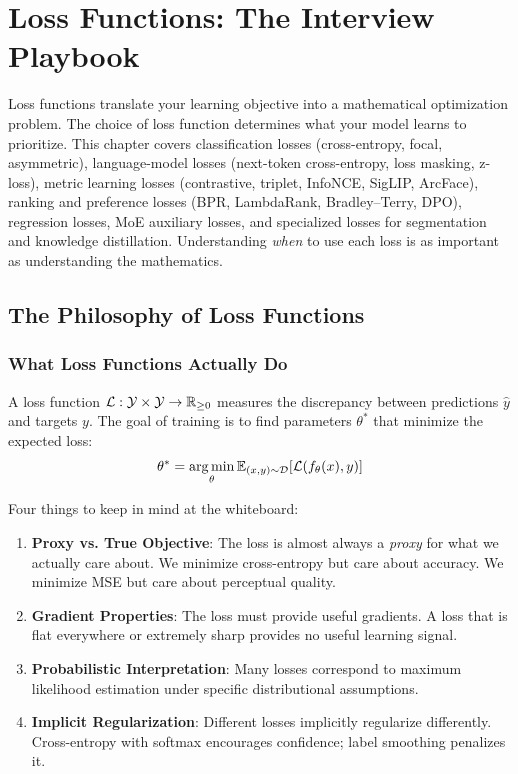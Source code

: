 \chapter{Loss Functions: The Interview Playbook}
\label{chap:loss_functions}

\begin{tldr}
Loss functions translate your learning objective into a mathematical optimization problem. The choice of loss function determines what your model learns to prioritize. This chapter covers classification losses (cross-entropy, focal, asymmetric), language-model losses (next-token cross-entropy, loss masking, z-loss), metric learning losses (contrastive, triplet, InfoNCE, SigLIP, ArcFace), ranking and preference losses (BPR, LambdaRank, Bradley--Terry, DPO), regression losses, MoE auxiliary losses, and specialized losses for segmentation and knowledge distillation. Understanding \textit{when} to use each loss is as important as understanding the mathematics.
\end{tldr}

\section{The Philosophy of Loss Functions}
\label{sec:loss_philosophy}

\subsection{What Loss Functions Actually Do}

A loss function $\mathcal{L}: \mathcal{Y} \times \mathcal{Y} \to \mathbb{R}_{\geq 0}$ measures the discrepancy between predictions $\hat{y}$ and targets $y$. The goal of training is to find parameters $\theta^*$ that minimize the expected loss:
\begin{equation}
\theta^* = \operatorname*{arg\,min}_\theta \operatorname{\mathbb{E}}_{(x,y) \sim \mathcal{D}}[\mathcal{L}(f_\theta(x), y)]
\end{equation}

Four things to keep in mind at the whiteboard:

\begin{enumerate}
    \item \textbf{Proxy vs. True Objective}: The loss is almost always a \textit{proxy} for what we actually care about. We minimize cross-entropy but care about accuracy. We minimize MSE but care about perceptual quality.

    \item \textbf{Gradient Properties}: The loss must provide useful gradients. A loss that is flat everywhere or extremely sharp provides no useful learning signal.

    \item \textbf{Probabilistic Interpretation}: Many losses correspond to maximum likelihood estimation under specific distributional assumptions.

    \item \textbf{Implicit Regularization}: Different losses implicitly regularize differently. Cross-entropy with softmax encourages confidence; label smoothing penalizes it.
\end{enumerate}

